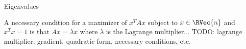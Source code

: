 

Eigenvalues


\begin{prop}
  A necessary condition for a maximizer of $x^TAx$ subject to $x \in \RVec{n}$ and $x^Tx = 1$ is that $Ax = \lambda x$ where $\lambda$ is the Lagrange multiplier...
  TODO: lagrange multiplier, gradient, quadratic form, necessary conditions, etc.
\end{prop}
